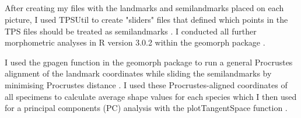 
\subsection{}
\label{sect:procrustes}

	After creating my files with the landmarks and semilandmarks placed on each picture, I used TPSUtil \citep{Rohlf2012} to create "sliders" files that defined which points in the TPS files should be treated as semilandmarks \citep{Zelditch2012}. I conducted all further morphometric analyses in R version 3.0.2 \citep{Team2014} within the geomorph package \citep{Adams2013}.
	
	
	I used the gpagen function in the geomorph package \citep{Adams2013} to run a general Procrustes alignment \citep{Rohlf1993} of the landmark coordinates while sliding the semilandmarks by minimising Procrustes distance \citep{Bookstein1997}.
	I used these Procrustes-aligned coordinates of all specimens to calculate average shape values for each species which I then used for a principal components (PC) analysis with the plotTangentSpace function \citep{Adams2013}. 
	




